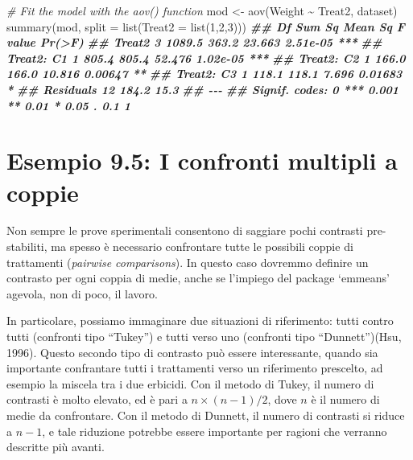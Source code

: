 \documentclass[
  12pt,
]{book}
\newenvironment{Shaded}{\begin{snugshade}}{\end{snugshade}}
\newcommand{\AttributeTok}[1]{\textcolor[rgb]{0.77,0.63,0.00}{#1}}
\newcommand{\CommentTok}[1]{\textcolor[rgb]{0.56,0.35,0.01}{\textit{#1}}}
\newcommand{\DecValTok}[1]{\textcolor[rgb]{0.00,0.00,0.81}{#1}}
\newcommand{\DocumentationTok}[1]{\textcolor[rgb]{0.56,0.35,0.01}{\textbf{\textit{#1}}}}
\newcommand{\FunctionTok}[1]{\textcolor[rgb]{0.00,0.00,0.00}{#1}}
\newcommand{\NormalTok}[1]{#1}
\newcommand{\OtherTok}[1]{\textcolor[rgb]{0.56,0.35,0.01}{#1}}
\newcommand{\SpecialCharTok}[1]{\textcolor[rgb]{0.00,0.00,0.00}{#1}}
\begin{document}
\begin{Shaded}
\begin{Highlighting}[]
\CommentTok{\# Fit the model with the \textquotesingle{}aov()\textquotesingle{} function}
\NormalTok{mod }\OtherTok{\textless{}{-}} \FunctionTok{aov}\NormalTok{(Weight }\SpecialCharTok{\textasciitilde{}}\NormalTok{ Treat2, dataset)}
\FunctionTok{summary}\NormalTok{(mod, }\AttributeTok{split =} \FunctionTok{list}\NormalTok{(}\AttributeTok{Treat2 =} \FunctionTok{list}\NormalTok{(}\DecValTok{1}\NormalTok{,}\DecValTok{2}\NormalTok{,}\DecValTok{3}\NormalTok{)))}
\DocumentationTok{\#\#              Df Sum Sq Mean Sq F value   Pr(\textgreater{}F)    }
\DocumentationTok{\#\# Treat2        3 1089.5   363.2  23.663 2.51e{-}05 ***}
\DocumentationTok{\#\#   Treat2: C1  1  805.4   805.4  52.476 1.02e{-}05 ***}
\DocumentationTok{\#\#   Treat2: C2  1  166.0   166.0  10.816  0.00647 ** }
\DocumentationTok{\#\#   Treat2: C3  1  118.1   118.1   7.696  0.01683 *  }
\DocumentationTok{\#\# Residuals    12  184.2    15.3                     }
\DocumentationTok{\#\# {-}{-}{-}}
\DocumentationTok{\#\# Signif. codes:  0 \textquotesingle{}***\textquotesingle{} 0.001 \textquotesingle{}**\textquotesingle{} 0.01 \textquotesingle{}*\textquotesingle{} 0.05 \textquotesingle{}.\textquotesingle{} 0.1 \textquotesingle{} \textquotesingle{} 1}
\end{Highlighting}
\end{Shaded}

\hypertarget{esempio-9.5-i-confronti-multipli-a-coppie}{%
\section{Esempio 9.5: I confronti multipli a coppie}\label{esempio-9.5-i-confronti-multipli-a-coppie}}

Non sempre le prove sperimentali consentono di saggiare pochi contrasti pre-stabiliti, ma spesso è necessario confrontare tutte le possibili coppie di trattamenti (\emph{pairwise comparisons}). In questo caso dovremmo definire un contrasto per ogni coppia di medie, anche se l'impiego del package `emmeans' agevola, non di poco, il lavoro.

In particolare, possiamo immaginare due situazioni di riferimento: tutti contro tutti (confronti tipo ``Tukey'') e tutti verso uno (confronti tipo ``Dunnett'')(Hsu, 1996). Questo secondo tipo di contrasto può essere interessante, quando sia importante confrantare tutti i trattamenti verso un riferimento prescelto, ad esempio la miscela tra i due erbicidi. Con il metodo di Tukey, il numero di contrasti è molto elevato, ed è pari a \(n \times (n - 1) / 2\), dove \(n\) è il numero di medie da confrontare. Con il metodo di Dunnett, il numero di contrasti si riduce a \(n - 1\), e tale riduzione potrebbe essere importante per ragioni che verranno descritte più avanti.
\end{document}
